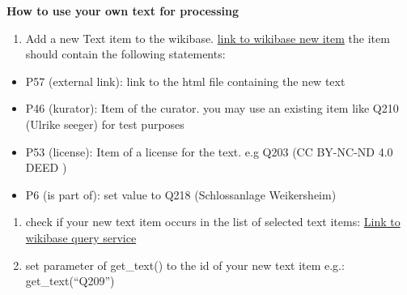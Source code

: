\documentclass[
  letterpaper,
]{book}
\providecommand{\tightlist}{%
  \setlength{\itemsep}{0pt}\setlength{\parskip}{0pt}}\usepackage{longtable,booktabs,array}
\begin{document}
\textbf{How to use your own text for processing}

\begin{enumerate}
\def\labelenumi{\arabic{enumi}.}
\tightlist
\item
  Add a new Text item to the wikibase.
  \href{https://computational-publishing-service.wikibase.cloud/wiki/Special:NewItem}{link
  to wikibase new item} the item should contain the following
  statements:
\end{enumerate}

\begin{itemize}
\tightlist
\item
  P57 (external link): link to the html file containing the new text
\item
  P46 (kurator): Item of the curator. you may use an existing item like
  Q210 (Ulrike seeger) for test purposes
\item
  P53 (license): Item of a license for the text. e.g Q203 (CC BY-NC-ND
  4.0 DEED )
\item
  P6 (is part of): set value to Q218 (Schlossanlage Weikersheim)
\end{itemize}

\begin{enumerate}
\def\labelenumi{\arabic{enumi}.}
\setcounter{enumi}{1}
\item
  check if your new text item occurs in the list of selected text items:
  \href{https://computational-publishing-service.wikibase.cloud/query/\#PREFIX\%20cps\%3A\%20\%3Chttps\%3A\%2F\%2Fcomputational-publishing-service.wikibase.cloud\%2Fentity\%2F\%3E\%0APREFIX\%20cpss\%3A\%20\%3Chttps\%3A\%2F\%2Fcomputational-publishing-service.wikibase.cloud\%2Fentity\%2Fstatement\%2F\%3E\%0APREFIX\%20cpsv\%3A\%20\%3Chttps\%3A\%2F\%2Fcomputational-publishing-service.wikibase.cloud\%2Fvalue\%2F\%3E\%0APREFIX\%20cpspt\%3A\%20\%3Chttps\%3A\%2F\%2Fcomputational-publishing-service.wikibase.cloud\%2Fprop\%2Fdirect\%2F\%3E\%0APREFIX\%20cpsp\%3A\%20\%3Chttps\%3A\%2F\%2Fcomputational-publishing-service.wikibase.cloud\%2Fprop\%2F\%3E\%0APREFIX\%20cpsps\%3A\%20\%3Chttps\%3A\%2F\%2Fcomputational-publishing-service.wikibase.cloud\%2Fprop\%2Fstatement\%2F\%3E\%0APREFIX\%20cpspq\%3A\%20\%3Chttps\%3A\%2F\%2Fcomputational-publishing-service.wikibase.cloud\%2Fprop\%2Fqualifier\%2F\%3E\%0A\%0ASELECT\%20\%3FtextItem\%20\%3FkuratorLabel\%20\%3FtextUrl\%0AWHERE\%0A\%7B\%0A\%20\%20\%3FtextItem\%20cpsp\%3AP46\%20\%3FkuratorStatement.\%20\%0A\%20\%20\%3FkuratorStatement\%20cpsps\%3AP46\%20\%3FkuratorItem.\%20\%0A\%20\%20\%3FkuratorItem\%20rdfs\%3Alabel\%20\%3FkuratorLabel.\%0A\%20\%20\%3FtextItem\%20cpsp\%3AP57\%20\%3Furlstatement.\%20\%0A\%20\%20\%3Furlstatement\%20cpsps\%3AP57\%20\%3FtextUrl.\%20\%0A\%7D}{Link
  to wikibase query service}
\item
  set parameter of get\_text() to the id of your new text item e.g.:
  get\_text(``Q209'')
\end{enumerate}
\end{document}
